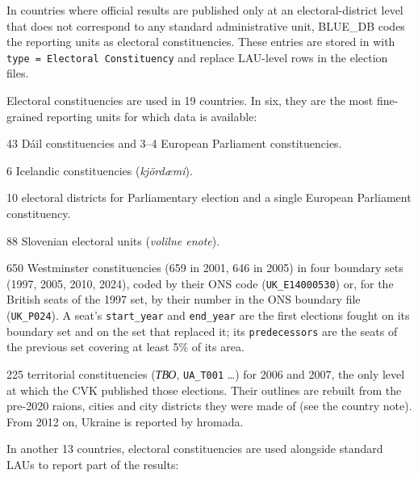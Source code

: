 In countries where official results are published only at an electoral-district
level that does not correspond to any standard administrative unit, BLUE\_DB
codes the reporting units as electoral constituencies.
These entries are stored in  with
\texttt{type = Electoral Constituency} and replace LAU-level rows in the
election files.

Electoral constituencies are used in 19 countries. In six, they are the
most fine-grained reporting units for which data is available:

\begin{description}[leftmargin=1.5cm, style=sameline]
  \item[IE] 43 D\'ail constituencies and 3--4 European Parliament constituencies.
  \item[IS] 6 Icelandic constituencies (\textit{kjörd\ae mi}).
  \item[MT] 10 electoral districts for Parliamentary election and a single
  European Parliament constituency.
  \item[SI] 88 Slovenian electoral units (\textit{volilne enote}).
  \item[UK] 650 Westminster constituencies (659 in 2001, 646 in 2005) in four
            boundary sets (1997, 2005, 2010, 2024), coded by their ONS code
            (\texttt{UK\_E14000530}) or, for the British seats of the 1997
            set, by their number in the ONS boundary file
            (\texttt{UK\_P024}).  A seat's \texttt{start\_year} and
            \texttt{end\_year} are the first elections fought on its boundary
            set and on the set that replaced it; its \texttt{predecessors} are
            the seats of the previous set covering at least 5\% of its area.
  \item[UA] 225 territorial constituencies (\textit{ТВО}, \texttt{UA\_T001}
            \ldots) for 2006 and 2007, the only level at which the CVK
            published those elections.  Their outlines are rebuilt from the
            pre-2020 raions, cities and city districts they were made of (see
            the country note).  From 2012 on, Ukraine is reported by hromada.
\end{description}

In another 13 countries, electoral constituencies are used alongside standard
LAUs to report part of the results:

